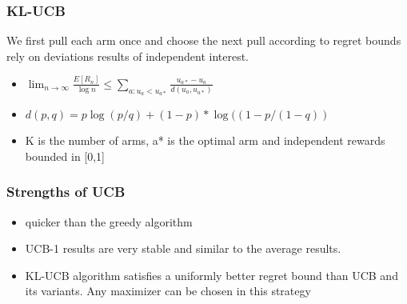 \documentclass{beamer}
\begin{document}
    \begin{frame}
        \frametitle{KL-UCB}
        We first pull each arm once and choose the next pull according to regret bounds rely on deviations results of independent interest.\footnotemark[1]

        \begin{itemize}
            \item<1->$\lim_{n\to \infty} \frac{E[R_n]}{\log n} \leq  \sum_{a:u_a < u_{a*}} \frac{u_{a*}-u_a}{d(u_a,u_{a*})}  $
            \item<2->  $d(p, q) = p \log(p/q) + (1 - p) * \log((1 - p/(1 - q))$
            \item<3->  K is the number of arms, a* is the optimal arm and independent rewards bounded in [0,1]
        \end{itemize}
    \end{frame}

    \begin{frame}
        \frametitle{Strengths of UCB}

        \begin{itemize}
            \item<1-> quicker than the greedy algorithm
            \item<2->  UCB-1 results are very stable and similar to the average results.
            \item<3->   KL-UCB algorithm satisfies a uniformly better regret bound than UCB and its variants. Any maximizer can be chosen in this strategy\footnotemark[1]
        \end{itemize}
    \end{frame}
\end{document}
